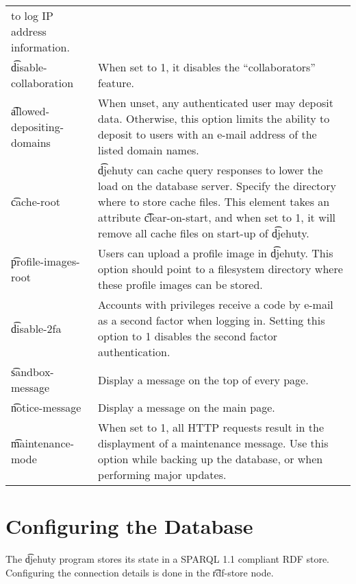\begin{tabular}{p{} p{}}
                               to log IP address information.\\
  \t{disable-collaboration}  & When set to 1, it disables the ``collaborators''
                               feature.\\
  \t{allowed-depositing-domains} & When unset, any authenticated user may
                               deposit data.  Otherwise, this option limits the
                               ability to deposit to users with an e-mail
                               address of the listed domain names.\\
  \t{cache-root}             & \t{djehuty} can cache query responses to lower
                               the load on the database server.  Specify the
                               directory where to store cache files.  This
                               element takes an attribute \t{clear-on-start},
                               and when set to 1, it will remove all cache files
                               on start-up of \t{djehuty}.\\
  \t{profile-images-root}    & Users can upload a profile image in \t{djehuty}.
                               This option should point to a filesystem directory
                               where these profile images can be stored.\\
  \t{disable-2fa}            & Accounts with privileges receive a code by e-mail
                               as a second factor when logging in.  Setting this
                               option to 1 disables the second factor
                               authentication.\\
  \t{sandbox-message}        & Display a message on the top of every page.\\
  \t{notice-message}         & Display a message on the main page.\\
  \t{maintenance-mode}       & When set to 1, all HTTP requests result in the
                               displayment of a maintenance message. Use this
                               option while backing up the database, or when
                               performing major updates.\\
\end{tabular}

\section{Configuring the Database}

  The \t{djehuty} program stores its state in a SPARQL 1.1 compliant
  RDF store.  Configuring the connection details is done in the
  \t{rdf-store} node.

